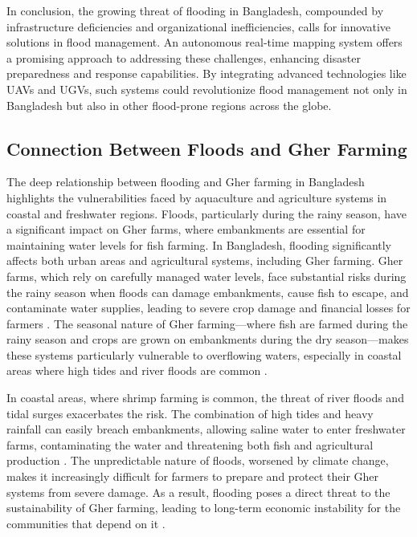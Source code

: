\documentclass[conference]{IEEEtran}
\begin{document}
In conclusion, the growing threat of flooding in Bangladesh, compounded by infrastructure deficiencies and organizational inefficiencies, calls for innovative solutions in flood management. An autonomous real-time mapping system offers a promising approach to addressing these challenges, enhancing disaster preparedness and response capabilities. By integrating advanced technologies like UAVs and UGVs, such systems could revolutionize flood management not only in Bangladesh but also in other flood-prone regions across the globe.

\subsection{\textbf{Connection Between Floods and Gher Farming}}
The deep relationship between flooding and Gher farming in Bangladesh highlights the vulnerabilities faced by aquaculture and agriculture systems in coastal and freshwater regions. Floods, particularly during the rainy season, have a significant impact on Gher farms, where embankments are essential for maintaining water levels for fish farming. In Bangladesh, flooding significantly affects both urban areas and agricultural systems, including Gher farming. Gher farms, which rely on carefully managed water levels, face substantial risks during the rainy season when floods can damage embankments, cause fish to escape, and contaminate water supplies, leading to severe crop damage and financial losses for farmers \cite{ref5}. The seasonal nature of Gher farming—where fish are farmed during the rainy season and crops are grown on embankments during the dry season—makes these systems particularly vulnerable to overflowing waters, especially in coastal areas where high tides and river floods are common \cite{ref4}.

In coastal areas, where shrimp farming is common, the threat of river floods and tidal surges exacerbates the risk. The combination of high tides and heavy rainfall can easily breach embankments, allowing saline water to enter freshwater farms, contaminating the water and threatening both fish and agricultural production \cite{ref4}. The unpredictable nature of floods, worsened by climate change, makes it increasingly difficult for farmers to prepare and protect their Gher systems from severe damage. As a result, flooding poses a direct threat to the sustainability of Gher farming, leading to long-term economic instability for the communities that depend on it \cite{ref7}.
\end{document}
